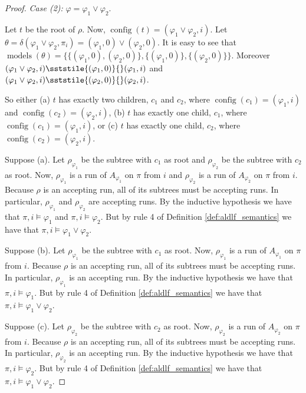 \documentclass[10pt,a4paper]{amsart}
\theoremstyle{plain}
\theoremstyle{definition}
\theoremstyle{definition}
\newcommand{\sderives}[1]{\sststile{#1}{}}
\DeclareMathOperator{\config}{config}
\DeclareMathOperator{\?}{?}
\DeclareMathOperator{\mymodels}{models}
\begin{document}
\begin{proof}
    \textit{Case (2):} $\varphi = \varphi_1 \vee \varphi_2$.

    Let $t$ be the root of $\rho$. Now, $\config(t) = (\varphi_1 \vee \varphi_2,i)$.
    Let $\theta = \delta(\varphi_1 \vee \varphi_2,\pi_i) = (\varphi_1,0) \vee (\varphi_2,0)$. It is easy to
    see that $\mymodels(\theta) = \{ \{ (\varphi_1,0),(\varphi_2,0)  \}, \{ (\varphi_1,0)  \}, \{ (\varphi_2,0) \} \}$.
    Moreover $(\varphi_1 \vee \varphi_2,i) \sderives{(\varphi_1,0)} (\varphi_1,i)$
    and $(\varphi_1 \vee \varphi_2,i) \sderives{(\varphi_2,0)} (\varphi_2,i)$.

    So either (a) $t$ has exactly two children, $c_1$ and $c_2$, where $\config(c_1) = (\varphi_1,i)$ and
    $\config(c_2) = (\varphi_2,i)$, (b) $t$ has exactly one child, $c_1$, where $\config(c_1) = (\varphi_1,i)$,
    or (c) $t$ has exactly one child, $c_2$, where $\config(c_2) = (\varphi_2,i)$.

    Suppose (a). Let $\rho_{\varphi_1}$ be the subtree with $c_1$ as root and $\rho_{\varphi_2}$ be the subtree
    with $c_2$ as root. Now, $\rho_{\varphi_1}$ is a run of $A_{\varphi_1}$ on $\pi$ from $i$ and $\rho_{\varphi_2}$
    is a run of $A_{\varphi_2}$ on $\pi$ from $i$. Because $\rho$ is an accepting run, all of its subtrees must
    be accepting runs. In particular, $\rho_{\varphi_1}$ and $\rho_{\varphi_2}$ are accepting runs. By the inductive hypothesis
    we have that $\pi,i \models \varphi_1$ and $\pi,i \models \varphi_2$. But by rule 4 of Definition \ref{def:aldlf_semantics}
    we have that $\pi,i \models \varphi_1 \vee \varphi_2$.

    Suppose (b). Let $\rho_{\varphi_1}$ be the subtree with $c_1$ as root. Now, $\rho_{\varphi_1}$ is a run of $A_{\varphi_1}$
    on $\pi$ from $i$. Because $\rho$ is an accepting run, all of its subtrees must be accepting runs. In particular,
    $\rho_{\varphi_1}$ is an accepting run. By the inductive hypothesis we have that $\pi,i \models \varphi_1$. But by rule 4
    of Definition \ref{def:aldlf_semantics} we have that $\pi,i \models \varphi_1 \vee \varphi_2$.

    Suppose (c). Let $\rho_{\varphi_2}$ be the subtree with $c_2$ as root. Now, $\rho_{\varphi_2}$ is a run of $A_{\varphi_2}$ on
    $\pi$ from $i$. Because $\rho$ is an accepting run, all of its subtrees must be accepting runs. In particular, $\rho_{\varphi_2}$
    is an accepting run. By the inductive hypothesis we have that $\pi,i \models \varphi_2$. But by rule 4 of
    Definition \ref{def:aldlf_semantics} we have that $\pi,i \models \varphi_1 \vee \varphi_2$.


\end{proof}
\end{document}
